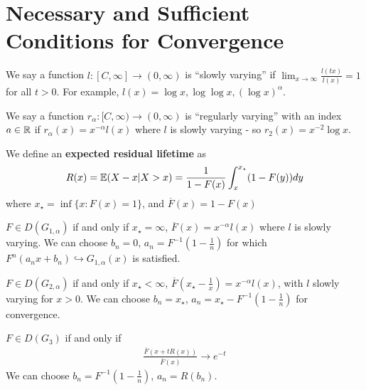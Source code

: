 \section{Necessary and Sufficient Conditions for Convergence}
\label{sec:necess-suff-cond}

We say a function $l: [C, \infty] \rightarrow (0, \infty)$ is ``slowly
varying'' if $\lim_{x \rightarrow \infty} \frac{l(tx)}{l(x)} = 1$ for
all $t > 0$.  For example, $l (x) = \log x, \log \log x, (\log
x)^{\alpha}$.  

We say a function $r_{\alpha}: [C, \infty) \rightarrow (0, \infty)$ is
``regularly varying'' with an index $a \in \mathbb{R}$ if $r_{\alpha}(x) =
x^{-\alpha}l(x)$ where $l$ is slowly varying - so $r_{2}(x) = x^{-2}
\log x$.

We define an \textbf{expected residual lifetime} as
\begin{align}
  \label{eq:120}
  R(x) = \E{X - x | X > x} = \frac{1}{1 - F(x)} \int_{x}^{x_{\star}}
  (1 - F(y)) dy
\end{align} where $x_{\star} = \inf \{ x : F(x) = 1 \}$, and
$\overline F(x) = 1 - F(x)$

\begin{thm}
  \label{defn:extreme_value_theory:4}
  $F \in D(G_{1, \alpha})$ if and only if $x_{\star} = \infty$,
  $\overline F(x) = x^{-\alpha} l(x)$ where $l$ is slowly varying.  We
  can choose $b_{n} = 0$, $a_{n} = F^{-1}(1 - \frac{1}{n})$ for which
  $F^{n}(a_{n} x + b_{n}) \hookrightarrow G_{1, \alpha}(x)$ is
  satisfied.

  $F \in D(G_{2, \alpha})$ if and only if $x_{\star} < \infty$,
  $\overline F(x_{\star} - \frac{1}{x} ) = x^{-\alpha} l(x)$, with $l$
  slowly varying for $x > 0$.  We can choose $b_{n} = x_{\star}$,
  $a_{n} = x_{\star} - F^{-1}(1 - \frac{1}{n})$ for convergence.

  $F \in D(G_{3})$ if and only if
  \begin{align}
    \label{eq:124}
    \frac{\overline F(x + t R(x))}{\overline F(x)}  \rightarrow e^{-t}
  \end{align} We can choose $b_{n} = F^{-1}(1 - \frac{1}{n})$, $a_{n}
  = R(b_{n})$.
\end{thm}

